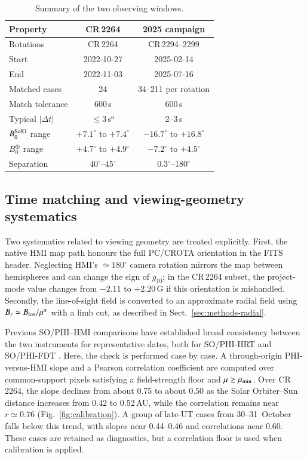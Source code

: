 \documentclass{aa}
\begin{document}
\begin{table}
\caption{Summary of the two observing windows.}
\label{tab:data}
\centering
\footnotesize
\begin{tabular}{lcc}
\hline\hline
Property & CR\,2264 & 2025 campaign \\
\hline
Rotations & CR\,2264 & CR\,2294--2299 \\
Start & 2022-10-27 & 2025-02-14 \\
End & 2022-11-03 & 2025-07-16 \\
Matched cases & 24 & 34--211 per rotation \\
Match tolerance & 600\,s & 600\,s \\
Typical $|\Delta t|$ & $\le3$\,s$^{a}$ & 2--3\,s \\
$B^{\rm SolO}_0$ range & $+7.1^{\circ}$ to $+7.4^{\circ}$ & $-16.7^{\circ}$ to $+16.8^{\circ}$ \\
$B^{\oplus}_0$ range & $+4.7^{\circ}$ to $+4.9^{\circ}$ & $-7.2^{\circ}$ to $+4.5^{\circ}$ \\
Separation & $40^{\circ}$--$45^{\circ}$ & $0.3^{\circ}$--$180^{\circ}$ \\
\hline
\end{tabular}
\end{table}

\subsection{Time matching and viewing-geometry systematics}
\label{sec:data-systematics}

Two systematics related to viewing geometry are treated explicitly. First, the native HMI map path honours the full PC/CROTA orientation in the FITS header. Neglecting HMI's $\simeq180^{\circ}$ camera rotation mirrors the map between hemispheres and can change the sign of $g_{10}$; in the CR\,2264 subset, the project-mode value changes from $-2.11$ to $+2.20$\,G if this orientation is mishandled. Secondly, the line-of-sight field is converted to an approximate radial field using $B_r\simeq B_{\rm los}/\mu^{\alpha}$ with a limb cut, as described in Sect.~\ref{sec:methods-radial}.

Previous SO/PHI--HMI comparisons have established broad consistency between the two instruments for representative dates, both for SO/PHI-HRT \citep{Sinjan2023} and SO/PHI-FDT \citep{MorenoVacas2024}. Here, the check is performed case by case. A through-origin PHI-versus-HMI slope and a Pearson correlation coefficient are computed over common-support pixels satisfying a field-strength floor and $\mu\ge\mu_{\rm min}$. Over CR\,2264, the slope declines from about 0.75 to about 0.50 as the Solar Orbiter--Sun distance increases from 0.42 to 0.52\,AU, while the correlation remains near $r\simeq0.76$ (Fig.~\ref{fig:calibration}). A group of late-UT cases from 30--31~October falls below this trend, with slopes near 0.44--0.46 and correlations near 0.60. These cases are retained as diagnostics, but a correlation floor is used when calibration is applied.
\end{document}
